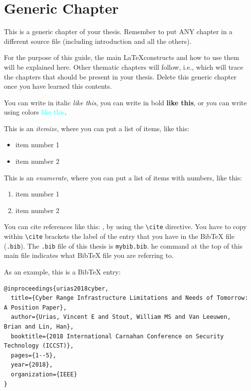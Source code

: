 \chapter{Generic Chapter}
This is a generic chapter of your thesis. Remember to put ANY chapter in a different source file (including introduction and all the others).

For the purpose of this guide, the main \LaTeX constructs and how to use them will be explained here. Other thematic chapters will follow, i.e., which will trace the chapters that should be present in your thesis. Delete this generic chapter once you have learned this contents.

You can write in italic \emph{like this}, you can write in bold \textbf{like this}, or you can write using colors \textcolor{cyan}{like this}.

This is an \emph{itemize}, where you can put a list of items, like this:
\begin{itemize}
	\item item number 1
	\item item number 2
\end{itemize}

This is an \emph{enumerate}, where you can put a list of items with numbers, like this:
\begin{enumerate}
	\item item number 1
	\item item number 2
\end{enumerate}

You can cite references like this: \cite{texbook} \cite{lamport94}, by using the \lstinline{\cite} directive. You have to copy within \lstinline{\cite} brackets the label of the entry that you have in the BibTeX file (\texttt{.bib}). The \texttt{.bib} file of this thesis is \texttt{mybib.bib}. he command \lstinline{} at the top of this main file indicates what BibTeX file you are referring to.

As an example, this is a BibTeX entry:

\begin{verbatim}
@inproceedings{urias2018cyber,
  title={Cyber Range Infrastructure Limitations and Needs of Tomorrow: A Position Paper},
  author={Urias, Vincent E and Stout, William MS and Van Leeuwen, Brian and Lin, Han},
  booktitle={2018 International Carnahan Conference on Security Technology (ICCST)},
  pages={1--5},
  year={2018},
  organization={IEEE}
}
\end{verbatim}

